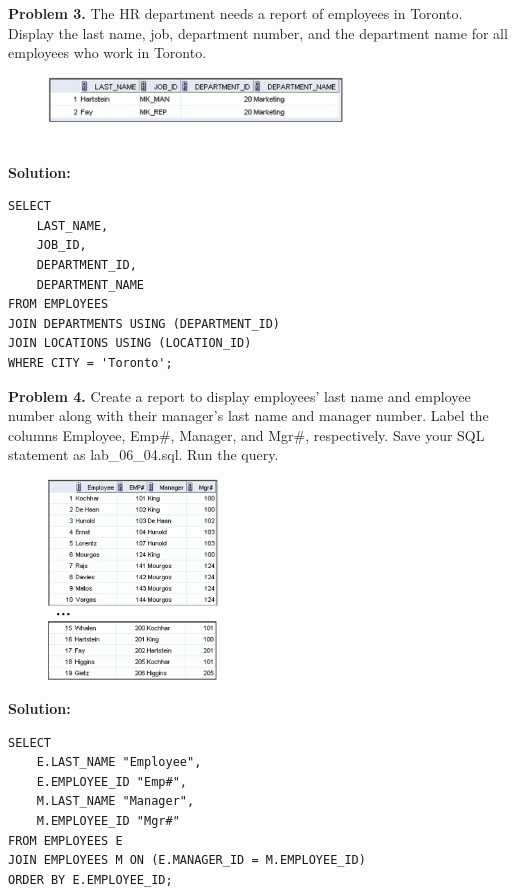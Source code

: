 \documentclass[12pt,a4paper]{article}
\begin{document}
\vspace{0.5cm}

\textbf{Problem 3.} The HR department needs a report of employees in Toronto. Display the last name, job, department number, and the department name for all employees who work in Toronto.
\begin{figure}[htbp]
  \centering
  \includegraphics[width=0.7\textwidth]{Screenshots/63.png}
\end{figure}\\
\textbf{Solution:}
\begin{lstlisting}[style=sqlstyle]
SELECT 
    LAST_NAME,
    JOB_ID,
    DEPARTMENT_ID,
    DEPARTMENT_NAME
FROM EMPLOYEES
JOIN DEPARTMENTS USING (DEPARTMENT_ID)
JOIN LOCATIONS USING (LOCATION_ID)
WHERE CITY = 'Toronto';
\end{lstlisting}

\vspace{0.5cm}

\textbf{Problem 4.} Create a report to display employees' last name and employee number along with their manager's last name and manager number. Label the columns Employee, Emp\#, Manager, and Mgr\#, respectively. Save your SQL statement as lab\_06\_04.sql. Run the query.
\begin{figure}[htbp]
  \centering
  \includegraphics[width=0.4\textwidth]{Screenshots/64.png}
\end{figure}
\textbf{Solution:}
\begin{lstlisting}[style=sqlstyle]
SELECT 
    E.LAST_NAME "Employee",
    E.EMPLOYEE_ID "Emp#",
    M.LAST_NAME "Manager",
    M.EMPLOYEE_ID "Mgr#"
FROM EMPLOYEES E
JOIN EMPLOYEES M ON (E.MANAGER_ID = M.EMPLOYEE_ID)
ORDER BY E.EMPLOYEE_ID;
\end{lstlisting}
\end{document}
